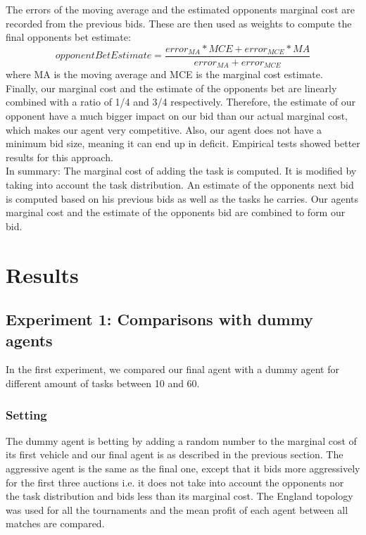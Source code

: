 \documentclass[11pt]{article}
\begin{document}
The errors of the moving average and the estimated opponents marginal cost are recorded from the previous bids. These are then used as weights to compute the final opponents bet estimate: 
$$opponentBetEstimate = \frac{error_{MA}*MCE + error_{MCE}*MA }{error_{MA}+error_{MCE}}$$
where MA is the moving average and MCE is the marginal cost estimate. \\

Finally, our marginal cost and the estimate of the opponents bet are linearly combined with a ratio of 1/4 and 3/4 respectively. Therefore, the estimate of our opponent have a much bigger impact on our bid than our actual marginal cost, which makes our agent very competitive. Also, our agent does not have a minimum bid size, meaning it can end up in deficit. Empirical tests showed better results for this approach. \\

In summary: The marginal cost of adding the task is computed. It is modified by taking into account the task distribution. An estimate of the opponents next bid is computed based on his previous bids as well as the tasks he carries. Our agents marginal cost and the estimate of the opponents bid are combined to form our bid.

\section{Results}

\subsection{Experiment 1: Comparisons with dummy agents}
In the first experiment, we compared our final agent with a dummy agent for different amount of tasks between 10 and 60.

\subsubsection{Setting}
The dummy agent is betting by adding a random number to the marginal cost of its first vehicle and our final agent is as described in the previous section. The aggressive agent is the same as the final one, except that it bids more aggressively for the first three auctions i.e. it does not take into account the opponents nor the task distribution and bids less than its marginal cost. The England topology was used for all the tournaments and the mean profit of each agent between all matches are compared.
\end{document}
